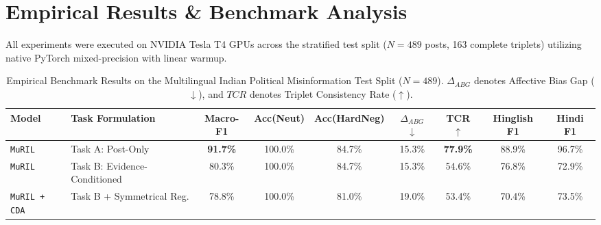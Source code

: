 \documentclass[11pt,a4paper]{article}
\begin{document}
\section{Empirical Results \& Benchmark Analysis}
All experiments were executed on NVIDIA Tesla T4 GPUs across the stratified test split ($N = 489$ posts, 163 complete triplets) utilizing native PyTorch mixed-precision with linear warmup.

\begin{table}[t]
\centering
\small
\caption{Empirical Benchmark Results on the Multilingual Indian Political Misinformation Test Split ($N=489$). $\Delta_{ABG}$ denotes Affective Bias Gap ($\downarrow$), and $TCR$ denotes Triplet Consistency Rate ($\uparrow$).}
\label{tab:main_results}
\vspace{0.5em}
\begin{tabular}{llccccccc}
\toprule
\textbf{Model} & \textbf{Task Formulation} & \textbf{Macro-F1} & \textbf{Acc(Neut)} & \textbf{Acc(HardNeg)} & \textbf{$\Delta_{ABG}$ $\downarrow$} & \textbf{TCR $\uparrow$} & \textbf{Hinglish F1} & \textbf{Hindi F1} \\
\midrule
\texttt{MuRIL} & Task A: Post-Only & \textbf{91.7\%} & 100.0\% & 84.7\% & 15.3\% & \textbf{77.9\%} & 88.9\% & 96.7\% \\
\texttt{MuRIL} & Task B: Evidence-Conditioned & 80.3\% & 100.0\% & 84.7\% & 15.3\% & 54.6\% & 76.8\% & 72.9\% \\
\texttt{MuRIL + CDA} & Task B + Symmetrical Reg. & 78.8\% & 100.0\% & 81.0\% & 19.0\% & 53.4\% & 70.4\% & 73.5\% \\
\bottomrule
\end{tabular}
\end{table}
\end{document}
